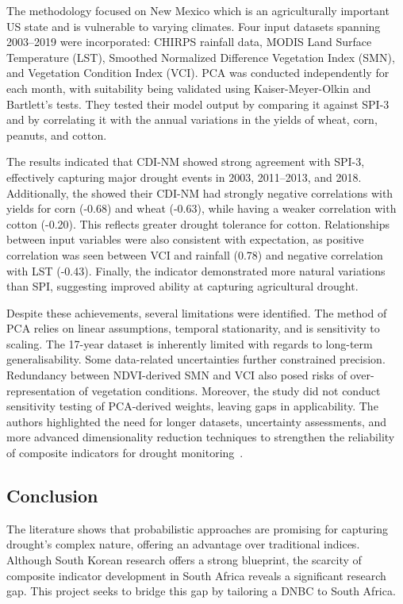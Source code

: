 The methodology focused on New Mexico which is an agriculturally important US state and is vulnerable to varying climates. Four input datasets spanning 2003–2019 were incorporated: CHIRPS rainfall data, MODIS Land Surface Temperature (LST), Smoothed Normalized Difference Vegetation Index (SMN), and Vegetation Condition Index (VCI). PCA was conducted independently for each month, with suitability being validated using Kaiser-Meyer-Olkin and Bartlett’s tests. They tested their model output by comparing it against SPI-3 and by correlating it with the annual variations in the yields of wheat, corn, peanuts, and cotton.

The results indicated that CDI-NM showed strong agreement with SPI-3, effectively capturing major drought events in 2003, 2011–2013, and 2018. Additionally, the showed their CDI-NM had strongly negative correlations with yields for corn (-0.68) and wheat (-0.63), while having a weaker correlation with cotton (-0.20). This reflects greater drought tolerance for cotton. Relationships between input variables were also consistent with expectation, as positive correlation was seen between VCI and rainfall (0.78) and negative correlation with LST (-0.43). Finally, the indicator demonstrated more natural variations than SPI, suggesting improved ability at capturing agricultural drought. 

Despite these achievements, several limitations were identified. The method of PCA relies on linear assumptions, temporal stationarity, and is sensitivity to scaling. The 17-year dataset is inherently limited with regards to long-term generalisability. Some data-related uncertainties further constrained precision. Redundancy between NDVI-derived SMN and VCI also posed risks of over-representation of vegetation conditions. Moreover, the study did not conduct sensitivity testing of PCA-derived weights, leaving gaps in applicability. The authors highlighted the need for longer datasets, uncertainty assessments, and more advanced dimensionality reduction techniques to strengthen the reliability of composite indicators for drought monitoring~\cite{atmos16070818}.

\subsection*{Conclusion}
The literature shows that probabilistic approaches are promising for capturing drought's complex nature, offering an advantage over traditional indices. Although South Korean research offers a strong blueprint, the scarcity of composite indicator development in South Africa reveals a significant research gap. This project seeks to bridge this gap by tailoring a DNBC to South Africa. 
